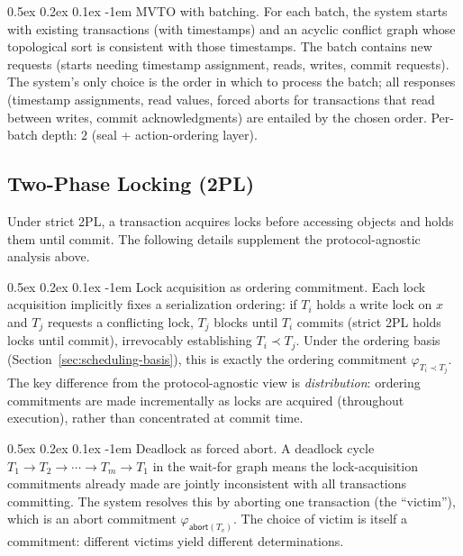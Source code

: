 \documentclass[acmsmall,review,anonymous]{acmart}
\makeatletter
\renewcommand{\paragraph}{\@startsection{paragraph}{4}{\z@}%
  {0.5ex \@plus 0.2ex \@minus 0.1ex}%
  {-1em}%
  {\normalfont\normalsize\bfseries}}
\theoremstyle{remark}
\numberwithin{definition}{section}
\numberwithin{theorem}{section}
\numberwithin{lemma}{section}
\numberwithin{corollary}{section}
\numberwithin{remark}{section}
\numberwithin{example}{section}
\numberwithin{observation}{section}
\numberwithin{assumption}{section}
\makeatother
\begin{document}
\paragraph{MVTO with batching.}
For each batch, the system starts with existing transactions (with
timestamps) and an acyclic conflict graph whose topological sort is
consistent with those timestamps.
The batch contains new requests (starts needing timestamp assignment,
reads, writes, commit requests).
The system's only choice is the order in which to process the batch;
all responses (timestamp assignments, read values, forced aborts for
transactions that read between writes, commit acknowledgments) are
entailed by the chosen order.
Per-batch depth: $2$ (seal + action-ordering layer).

\subsection{Two-Phase Locking (2PL)}

Under strict 2PL, a transaction acquires locks before accessing objects
and holds them until commit.
The following details supplement the protocol-agnostic analysis above.

\paragraph{Lock acquisition as ordering commitment.}
Each lock acquisition implicitly fixes a serialization ordering:
if $T_i$ holds a write lock on $x$ and $T_j$ requests a
conflicting lock, $T_j$ blocks until $T_i$ commits (strict 2PL holds
locks until commit), irrevocably establishing $T_i \prec T_j$.
Under the ordering basis
(Section~\ref{sec:scheduling-basis}), this is exactly the ordering
commitment $\varphi_{T_i \prec T_j}$.
The key difference from the protocol-agnostic view is \emph{distribution}:
ordering commitments are made incrementally as locks are acquired
(throughout execution), rather than concentrated at commit time.

\paragraph{Deadlock as forced abort.}
A deadlock cycle $T_1 \to T_2 \to \cdots \to T_m \to T_1$ in the
wait-for graph means the lock-acquisition commitments already made are
jointly inconsistent with all transactions committing.
The system resolves this by aborting one transaction (the ``victim''),
which is an abort commitment $\varphi_{\mathsf{abort}(T_v)}$.
The choice of victim is itself a commitment: different victims yield
different determinations.
\end{document}
